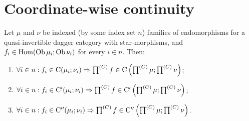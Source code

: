 \section{Coordinate-wise continuity}
\begin{thm}
Let $\mu$ and $\nu$ be indexed (by some index set $n$) families
of endomorphisms for a quasi-invertible dagger category with star-morphisms,
and $f_{i}\in\operatorname{Hom}(\operatorname{Ob}\mu_{i};\operatorname{Ob}\nu_{i})$ for every $i\in n$. Then:
\begin{enumerate}
\item $\forall i\in n:f_{i}\in\mathrm{C}(\mu_{i};\nu_{i})\Rightarrow\prod^{(C)}f\in\mathrm{C}\left(\prod^{(C)}\mu;\prod^{(C)}\nu\right)$;
\item $\forall i\in n:f_{i}\in\mathrm{C}'(\mu_{i};\nu_{i})\Rightarrow\prod^{(C)}f\in\mathrm{C}'\left(\prod^{(C)}\mu;\prod^{(C)}\nu\right)$;
\item $\forall i\in n:f_{i}\in\mathrm{C}''(\mu_{i};\nu_{i})\Rightarrow\prod^{(C)}f\in\mathrm{C}''\left(\prod^{(C)}\mu;\prod^{(C)}\nu\right)$.
\end{enumerate}
\end{thm}

